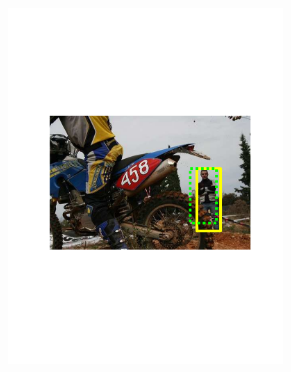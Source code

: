\begin{figure}[hbt]
\begin{subfigure}[b]{0.37\textwidth}
        \includegraphics[width=0.8\textwidth]{TP30971}
        \caption{}
        \label{fig:dettn2}
    \end{subfigure}
    

\end{figure}
